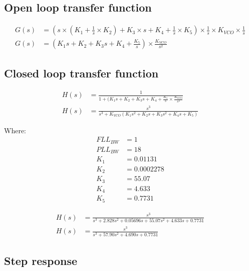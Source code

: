\subsection{Open loop transfer function}
\begin{comment}
(18, 1)
(1, array([ 0.        ,  0.01131368,  0.00022784]))
(18, 1)
(2, array([ 55.06692161,   4.63278117,   0.77306969]))
\end{comment}

\begin{align}
G(s) &= (s  \times (K_1 + \frac{1}{s} \times K_2) + K_3 \times s + K_4 + \frac{1}{s} \times K_5) \times \frac{1}{s} \times K_{VCO} \times \frac{1}{s}\\
G(s) &= (K_1 s + K_2 + K_3  s + K_4 + \frac{K_5}{s} ) \times \frac{K_{VCO}}{s^2}
\end{align}

\subsection{Closed loop transfer function}

\begin{comment}
PLL/FLL s^2 Ratio = 19.4
PLL/FLL s Ratio = 81.3339
\end{comment}

\begin{align}
H(s) &= \frac{1}{1+(K_1 s + K_2 + K_3  s +K_4  + \frac{K_5}{s}  \times \frac{K_{VCO}}{s^2}}\\
H(s) &= \frac{s^3}{s^3 + K_{VCO}(K_1 s^2 + K_2 s + K_3 s^2 + K_4 s + K_5)}
\end{align}

Where:
\begin{align*}
FLL_{BW}&=1\\
PLL_{BW}&=18\\
K_1 &=  0.01131\\
K_2 &=  0.0002278\\
K_3 &= 55.07\\
K_4 &= 4.633\\
K_5 &= 0.7731
\end{align*}

\begin{align}
H(s) &= \frac{s^3}{s^3 +2.828 s^2 + 0.05696 s + 55.07 s^2 + 4.633 s + 0.7731}\\
H(s) &= \frac{s^3}{s^3 +57.90 s^2 + 4.690 s +0.7731}
\end{align}

\subsection{Step response}

